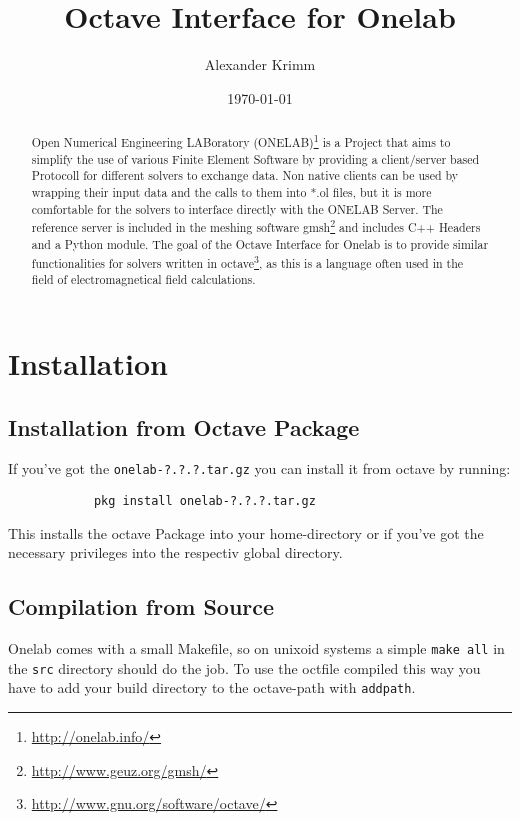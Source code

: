 \documentclass[article,english,colorback,accentcolor=tud9b,11pt]{tudreport}
\title{Octave Interface for Onelab}
\subtitle{Alexander Krimm}
\date{\today}
\begin{document}
	
    \maketitle

		\begin{abstract}
			Open Numerical Engineering LABoratory (ONELAB)\footnote{\url{http://onelab.info/}} is a Project that aims to simplify the use of various Finite Element Software by providing a client/server based Protocoll for different solvers to exchange data. Non native clients can be used by wrapping their input data and the calls to them into *.ol files, but it is more comfortable for the solvers to interface directly with the ONELAB Server. The reference server is included in the meshing software gmsh\footnote{\url{http://www.geuz.org/gmsh/}} and includes C++ Headers and a Python module. The goal of the Octave Interface for Onelab is to provide similar functionalities for solvers written in octave\footnote{\url{http://www.gnu.org/software/octave/}}, as this is a language often used in the field of electromagnetical field calculations.
		\end{abstract}

		\section{Installation}
		\subsection{Installation from Octave Package}
		If you've got the \texttt{onelab-?.?.?.tar.gz} you can install it from octave by running:
		\begin{lstlisting} 
			pkg install onelab-?.?.?.tar.gz
		\end{lstlisting}
		This installs the octave Package into your home-directory or if you've got the necessary privileges into the respectiv global directory.

		\subsection{Compilation from Source}
		Onelab comes with a small Makefile, so on unixoid systems a simple \texttt{make all} in the \texttt{src} directory should do the job. To use the octfile compiled this way you have to add your build directory to the octave-path with \texttt{addpath}.
\end{document}
